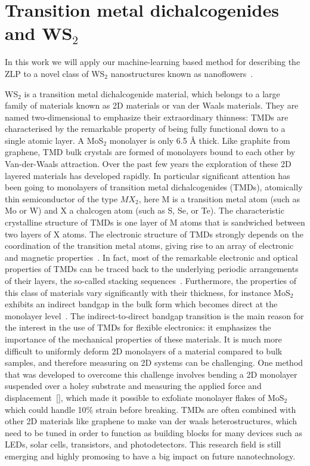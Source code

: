 \section{Transition metal dichalcogenides and WS$_2$}
\label{sec:tmd}

In this work we will apply our machine-learning based method
for describing the ZLP to a novel class of WS$_2$ nanostructures known
as nanoflowers~\cite{SabryaWS2}.

WS$_2$ is a transition metal dichalcogenide material, which 
belongs to a large family of materials known as 2D materials or van der Waals materials.
%
They are named two-dimensional to emphasize their extraordinary thinness: 
TMDs are characterised by the remarkable property of being fully 
functional down to a single atomic layer.
%
A MoS$_2$ monolayer is only 6.5 Å thick. Like graphite from graphene, 
TMD bulk crystals are formed of monolayers 
 bound to each other by Van-der-Waals attraction. 
%
Over the past few years the exploration of these 2D layered materials
 has developed rapidly. 
 In particular significant attention has been 
 going to monolayers of transition metal dichalcogenides (TMDs),
 atomically thin semiconductor of the type $MX_2$, here M is a 
transition metal atom (such as Mo or W) and X a chalcogen atom (such as S, Se, or Te). 
The characteristic crystalline structure of TMDs is one layer of M atoms 
that is sandwiched between two layers of X atoms.
The electronic structure of TMDs strongly depends on the coordination 
 of the transition metal atoms, giving rise to an array of electronic
 and magnetic properties~\cite{Chhowalla:2013}.
In fact, most of the remarkable electronic and optical properties of TMDs
can be traced back to the underlying periodic arrangements of their layers, 
the so-called stacking sequences~\cite{SabryaWS2}.
%
Furthermore, the properties of this class of materials vary significantly
with their thickness, for instance MoS$_2$ exhibits an indirect bandgap
in the bulk form which becomes direct at the monolayer level~\cite{Splendiani:2010}.
%
The indirect-to-direct bandgap transition is the main reason for the interest in 
the use of TMDs for flexible electronics: it emphasizes the importance of the
mechanical properties of these materials. 
%
It is much more difficult to uniformly deform 2D monolayers
of a material compared to bulk samples, and therefore measuring on 2D systems
can be challenging.
%
One method that was developed to overcome this challenge involves bending a 
2D monolayer suspended over a holey substrate and measuring the applied force
and displacement~\ref{}, which made it possible to exfoliate monolayer flakes 
of MoS$_2$ which could handle 10\% strain before breaking.
%
TMDs are often combined with other 2D materials like graphene
to make van der waals heterostructures, which need to be tuned in order
to function as building blocks for many devices such as LEDs, solar cells, 
transistors, and photodetectors.
%
This research field is still emerging and highly promosing to have a big
impact on future nanotechnology. \\
 
